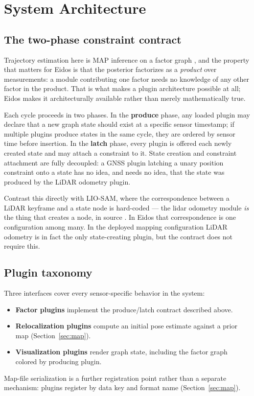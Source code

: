 \documentclass[conference]{IEEEtran}
\begin{document}
\section{System Architecture}

\subsection{The two-phase constraint contract}
Trajectory estimation here is MAP inference on a factor graph \parencite{dellaert2017factor}, and the property that matters for Eidos is that the posterior factorizes as a \emph{product} over measurements: a module contributing one factor needs no knowledge of any other factor in the product. That is what makes a plugin architecture possible at all; Eidos makes it architecturally available rather than merely mathematically true.

Each cycle proceeds in two phases. In the \textbf{produce} phase, any loaded plugin may declare that a new graph state should exist at a specific sensor timestamp; if multiple plugins produce states in the same cycle, they are ordered by sensor time before insertion. In the \textbf{latch} phase, every plugin is offered each newly created state and may attach a constraint to it. State creation and constraint attachment are fully decoupled: a GNSS plugin latching a unary position constraint onto a state has no idea, and needs no idea, that the state was produced by the LiDAR odometry plugin.

Contrast this directly with LIO-SAM, where the correspondence between a LiDAR keyframe and a state node is hard-coded --- the lidar odometry module \emph{is} the thing that creates a node, in source \parencite{shan2020liosam}. In Eidos that correspondence is one configuration among many. In the deployed mapping configuration LiDAR odometry is in fact the only state-creating plugin, but the contract does not require this.

\subsection{Plugin taxonomy}
Three interfaces cover every sensor-specific behavior in the system:
\begin{itemize}
    \item \textbf{Factor plugins} implement the produce/latch contract described above.
    \item \textbf{Relocalization plugins} compute an initial pose estimate against a prior map (Section~\ref{sec:map}).
    \item \textbf{Visualization plugins} render graph state, including the factor graph colored by producing plugin.
\end{itemize}
Map-file serialization is a further registration point rather than a separate mechanism: plugins register by data key and format name (Section~\ref{sec:map}).
\end{document}
